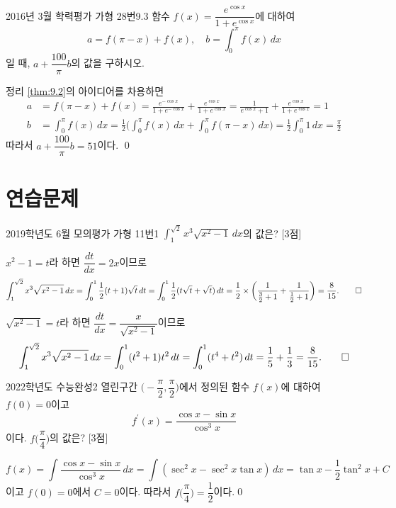 \documentclass{article}
\begin{document}
\begin{exc}{2016년 3월 학력평가 가형 28번}{9.3}
	함수 $f(x)=\dfrac{e^{\cos x}}{1+e^{\cos x}}$에 대하여
	\[
		a=f(\pi-x)+f(x),\quad b=\int_0^\pi f(x)\,dx
	\]
	일 때, $a+\dfrac{100}{\pi}b$의 값을 구하시오.
\end{exc}

\begin{sol}
	정리 \ref{thm:9.2}의 아이디어를 차용하면
	\begin{align*}
		a&=f(\pi-x)+f(x)=\frac{e^{-\cos x}}{1+e^{-\cos x}}+\frac{e^{\cos x}}{1+e^{\cos x}}=\frac{1}{e^{\cos x}+1}+\frac{e^{\cos x}}{1+e^{\cos x}}=1\\[3pt]
		b&=\int_0^\pi f(x)\,dx=\frac{1}{2}\bigg(\int_0^\pi f(x)\,dx+\int_0^\pi f(\pi-x)\,dx\biggr)=\frac{1}{2}\int_0^\pi1\,dx=\frac{\pi}{2}
	\end{align*}
	따라서 $a+\dfrac{100}{\pi}b=51$이다. \qed
\end{sol}

\newpage
\section*{연습문제}
\begin{prob}{2019학년도 6월 모의평가 가형 11번}{1}
	$\displaystyle\int_1^{\sqrt2}x^3\sqrt{x^2-1}\,dx$의 값은? [3점]
\end{prob}

\begin{sol}[풀이 1]
	$x^2-1=t$라 하면 $\dfrac{dt}{dx}=2x$이므로
	\[
		\int_1^{\sqrt2}x^3\sqrt{x^2-1}\,dx=\int_0^1\frac{1}{2}(t+1)\sqrt{t}\,dt=\int_0^1\frac{1}{2}(t\sqrt{t}+\sqrt{t})\,dt=\frac{1}{2}\times\biggl(\frac{1}{\frac{3}{2}+1}+\frac{1}{\frac{1}{2}+1}\biggr)=\frac{8}{15}.\qed
	\]
\end{sol}

\begin{sol}[풀이 2]
	$\sqrt{x^2-1}=t$라 하면 $\dfrac{dt}{dx}=\dfrac{x}{\sqrt{x^2-1}}$이므로
	\[
		\int_1^{\sqrt2}x^3\sqrt{x^2-1}\,dx=\int_0^1(t^2+1)t^2\,dt=\int_0^1(t^4+t^2)\,dt=\frac{1}{5}+\frac{1}{3}=\frac{8}{15}.\qed
	\]
\end{sol}

\newpage
\begin{prob}{2022학년도 수능완성}{2}
	열린구간 $\biggl(-\dfrac{\pi}{2}, \dfrac{\pi}{2}\biggr)$에서 정의된 함수 $f(x)$에 대하여 $f(0)=0$이고
	\[
		f^{\prime}(x)=\frac{\cos x-\sin x}{\cos^3x}
	\]
	이다. $f\bigg(\dfrac{\pi}{4}\biggr)$의 값은? [3점]
\end{prob}

\begin{sol}
	\[
		f(x)=\int\frac{\cos x-\sin x}{\cos^3x}\,dx=\int(\sec^2x-\sec ^2x\tan x)\,dx=\tan x-\frac{1}{2}\tan^2x+C
	\]
	이고 $f(0)=0$에서 $C=0$이다. 따라서 $f\bigg(\dfrac{\pi}{4}\biggr)=\dfrac{1}{2}$이다.\qed
\end{sol}
\end{document}
